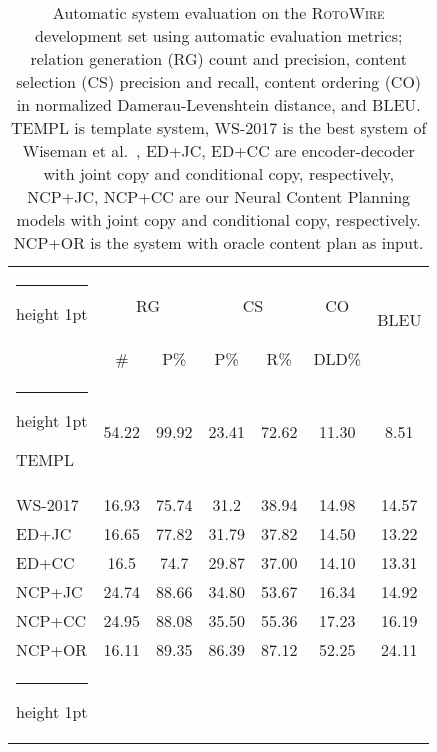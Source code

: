 \documentclass[letterpaper]{article} \usepackage{aaai19}  \usepackage{times}  \usepackage{helvet}  \usepackage{courier}  \usepackage{url}  \usepackage{graphicx}  \frenchspacing  \setlength{\pdfpagewidth}{8.5in}  \setlength{\pdfpageheight}{11in}  \graphicspath{ {images/} }
\makeatletter
\newcommand{\thickhline}{\noalign {\ifnum 0=`}\fi \hrule height 1pt
    \futurelet \reserved@a \@xhline
}
\makeatother
\begin{document}
\begin{table}[h]
\small
\centering
\begin{tabular}{@{~}l@{~}|@{~}c@{~~~}c@{~}|c@{~~~}c|c|@{~}c@{~} }
 \thickhline
 \multirow{2}{*}{Model} &\multicolumn{2}{c|}{RG} &\multicolumn{2}{c|}{CS} & CO & \multirow{2}{*}{BLEU}\\

 &\# & P\% & P\% & R\% & DLD\% & \\ \thickhline
TEMPL &54.22 &99.92 &23.41 &72.62 &11.30 &8.51  \\
WS-2017 & 16.93 & 75.74 & 31.2 & 38.94 & 14.98 & 14.57 \\ED+JC & 16.65 & 77.82 & 31.79 & 37.82 & 14.50 & 13.22  \\ ED+CC & 16.5 & 74.7 &29.87 & 37.00 & 14.10 & 13.31 \\ NCP+JC  & 24.74 & 88.66 & 34.80 & 53.67 & 16.34 & 14.92 \\ NCP+CC &24.95 & 88.08 & 35.50 & 55.36
 &17.23 & 16.19\\NCP+OR & 16.11 & 89.35 & 86.39 & 87.12 & 52.25 & 24.11\\
\thickhline
\end{tabular}
\caption{\label{generation-from-plan-dev-bug} Automatic system evaluation
  on the \textsc{RotoWire} development set using automatic evaluation
  metrics;  relation generation (RG)  count and precision, content selection (CS) precision and recall, content ordering (CO) in normalized
  Damerau-Levenshtein distance, and BLEU. TEMPL is template system, WS-2017 is the best system of Wiseman et al.~,
  ED+JC, ED+CC are encoder-decoder with joint copy and conditional copy, respectively, NCP+JC, NCP+CC are our Neural Content Planning models
  with joint copy and conditional copy, respectively. NCP+OR is the system with oracle content plan as input.}
\end{table}
\end{document}
